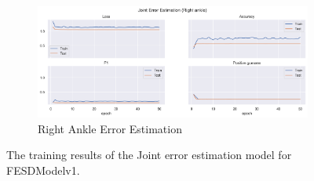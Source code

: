 \begin{figure}[!htbp]
\begin{subfigure}[b]{0.47\linewidth}
      \label{fig:v1_lean_jt_ee}
  \end{subfigure}
  \hfill
  \begin{subfigure}[b]{0.47\linewidth}
      \centering
      \includegraphics[width=\textwidth]{figures/Results/v1/jt/Right ankle_ErrorEstimation.png}
      \caption{Right Ankle Error Estimation}
      \label{fig:v1_rian_jt_ee}
  \end{subfigure}
  \caption[Detailed Training results for the Joint Problem Set]{The training results of the Joint error estimation model for FESDModelv1.}
  \label{fig:joint_training_results}
\end{figure}